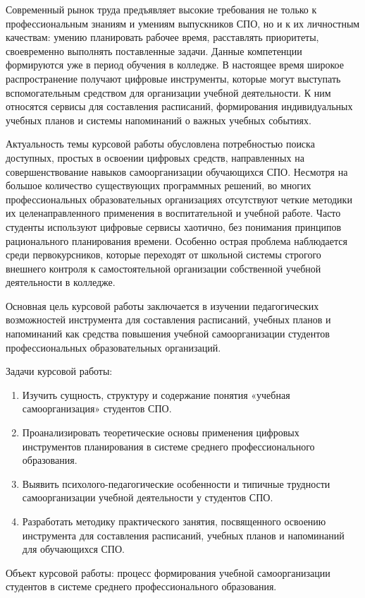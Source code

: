 \documentclass[14pt,a4paper]{article}
\begin{document}
Современный рынок труда предъявляет высокие требования не только к профессиональным знаниям и умениям выпускников СПО, но и к их личностным качествам: умению планировать рабочее время, расставлять приоритеты, своевременно выполнять поставленные задачи. Данные компетенции формируются уже в период обучения в колледже. В настоящее время широкое распространение получают цифровые инструменты, которые могут выступать вспомогательным средством для организации учебной деятельности. К ним относятся сервисы для составления расписаний, формирования индивидуальных учебных планов и системы напоминаний о важных учебных событиях.

Актуальность темы курсовой работы обусловлена потребностью поиска доступных, простых в освоении цифровых средств, направленных на совершенствование навыков самоорганизации обучающихся СПО. Несмотря на большое количество существующих программных решений, во многих профессиональных образовательных организациях отсутствуют четкие методики их целенаправленного применения в воспитательной и учебной работе. Часто студенты используют цифровые сервисы хаотично, без понимания принципов рационального планирования времени. Особенно острая проблема наблюдается среди первокурсников, которые переходят от школьной системы строгого внешнего контроля к самостоятельной организации собственной учебной деятельности в колледже.

Основная цель курсовой работы заключается в изучении педагогических возможностей инструмента для составления расписаний, учебных планов и напоминаний как средства повышения учебной самоорганизации студентов профессиональных образовательных организаций.

Задачи курсовой работы:
\begin{enumerate}
    \item Изучить сущность, структуру и содержание понятия «учебная самоорганизация» студентов СПО.
    \item Проанализировать теоретические основы применения цифровых инструментов планирования в системе среднего профессионального образования.
    \item Выявить психолого-педагогические особенности и типичные трудности самоорганизации учебной деятельности у студентов СПО.
    \item Разработать методику практического занятия, посвященного освоению инструмента для составления расписаний, учебных планов и напоминаний для обучающихся СПО.
\end{enumerate}

Объект курсовой работы: процесс формирования учебной самоорганизации студентов в системе среднего профессионального образования.
\end{document}
